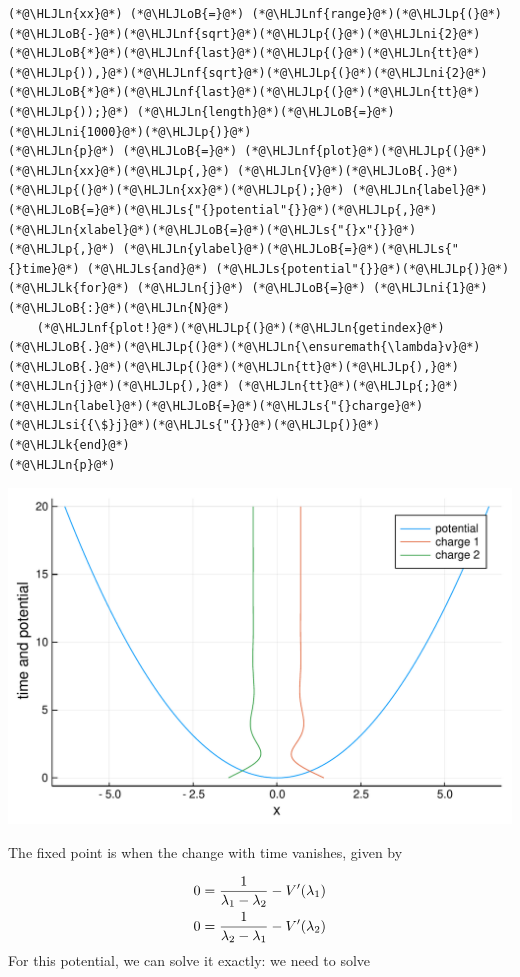 \documentclass[12pt,a4paper]{article}
\newcommand{\HLJLk}[1]{\textcolor[RGB]{148,91,176}{\textbf{#1}}}
\newcommand{\HLJLn}[1]{#1}
\newcommand{\HLJLnf}[1]{\textcolor[RGB]{66,102,213}{#1}}
\newcommand{\HLJLs}[1]{\textcolor[RGB]{201,61,57}{#1}}
\newcommand{\HLJLsi}[1]{#1}
\newcommand{\HLJLni}[1]{\textcolor[RGB]{59,151,46}{#1}}
\newcommand{\HLJLoB}[1]{\textcolor[RGB]{102,102,102}{\textbf{#1}}}
\newcommand{\HLJLp}[1]{#1}
\begin{document}
\begin{lstlisting}
(*@\HLJLn{xx}@*) (*@\HLJLoB{=}@*) (*@\HLJLnf{range}@*)(*@\HLJLp{(}@*)(*@\HLJLoB{-}@*)(*@\HLJLnf{sqrt}@*)(*@\HLJLp{(}@*)(*@\HLJLni{2}@*)(*@\HLJLoB{*}@*)(*@\HLJLnf{last}@*)(*@\HLJLp{(}@*)(*@\HLJLn{tt}@*)(*@\HLJLp{)),}@*)(*@\HLJLnf{sqrt}@*)(*@\HLJLp{(}@*)(*@\HLJLni{2}@*)(*@\HLJLoB{*}@*)(*@\HLJLnf{last}@*)(*@\HLJLp{(}@*)(*@\HLJLn{tt}@*)(*@\HLJLp{));}@*) (*@\HLJLn{length}@*)(*@\HLJLoB{=}@*)(*@\HLJLni{1000}@*)(*@\HLJLp{)}@*)
(*@\HLJLn{p}@*) (*@\HLJLoB{=}@*) (*@\HLJLnf{plot}@*)(*@\HLJLp{(}@*)(*@\HLJLn{xx}@*)(*@\HLJLp{,}@*) (*@\HLJLn{V}@*)(*@\HLJLoB{.}@*)(*@\HLJLp{(}@*)(*@\HLJLn{xx}@*)(*@\HLJLp{);}@*) (*@\HLJLn{label}@*)(*@\HLJLoB{=}@*)(*@\HLJLs{"{}potential"{}}@*)(*@\HLJLp{,}@*) (*@\HLJLn{xlabel}@*)(*@\HLJLoB{=}@*)(*@\HLJLs{"{}x"{}}@*)(*@\HLJLp{,}@*) (*@\HLJLn{ylabel}@*)(*@\HLJLoB{=}@*)(*@\HLJLs{"{}time}@*) (*@\HLJLs{and}@*) (*@\HLJLs{potential"{}}@*)(*@\HLJLp{)}@*)
(*@\HLJLk{for}@*) (*@\HLJLn{j}@*) (*@\HLJLoB{=}@*) (*@\HLJLni{1}@*)(*@\HLJLoB{:}@*)(*@\HLJLn{N}@*)
    (*@\HLJLnf{plot!}@*)(*@\HLJLp{(}@*)(*@\HLJLn{getindex}@*)(*@\HLJLoB{.}@*)(*@\HLJLp{(}@*)(*@\HLJLn{\ensuremath{\lambda}v}@*)(*@\HLJLoB{.}@*)(*@\HLJLp{(}@*)(*@\HLJLn{tt}@*)(*@\HLJLp{),}@*)(*@\HLJLn{j}@*)(*@\HLJLp{),}@*) (*@\HLJLn{tt}@*)(*@\HLJLp{;}@*) (*@\HLJLn{label}@*)(*@\HLJLoB{=}@*)(*@\HLJLs{"{}charge}@*) (*@\HLJLsi{{\$}j}@*)(*@\HLJLs{"{}}@*)(*@\HLJLp{)}@*)
(*@\HLJLk{end}@*)
(*@\HLJLn{p}@*)
\end{lstlisting}

\includegraphics[width=\linewidth]{figures/Lecture16_3_1.pdf}

The fixed point is when the change with time vanishes, given by


\begin{align*}
0 = {1 \over \lambda_1 -\lambda_2} - V'(\lambda_1) \\
0 = {1 \over \lambda_2 -\lambda_1} - V'(\lambda_2) 
\end{align*}
For this potential, we can solve it exactly: we need to solve
\end{document}
